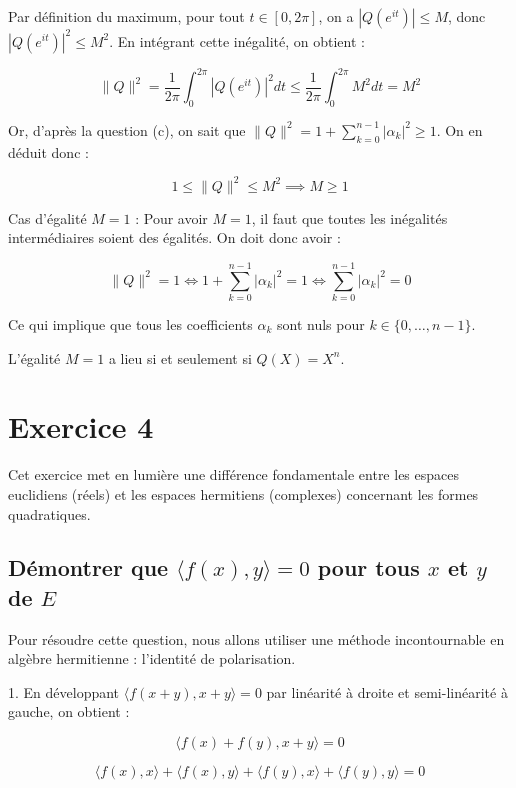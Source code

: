 \documentclass[french]{yLectureNote}
\begin{document}
Par définition du maximum, pour tout $t \in [0, 2\pi]$, on a $|Q(e^{it})| \le M$, donc $|Q(e^{it})|^2 \le M^2$.
En intégrant cette inégalité, on obtient :


$$\|Q\|^2 = \frac{1}{2\pi}\int_{0}^{2\pi} |Q(e^{it})|^2 dt \le \frac{1}{2\pi}\int_{0}^{2\pi} M^2 dt = M^2$$

Or, d'après la question (c), on sait que $\|Q\|^2 = 1 + \sum_{k=0}^{n-1} |\alpha_k|^2 \ge 1$.
On en déduit donc :


$$1 \le \|Q\|^2 \le M^2 \implies M \ge 1$$

Cas d'égalité $M = 1$ :
Pour avoir $M = 1$, il faut que toutes les inégalités intermédiaires soient des égalités. On doit donc avoir :


$$\|Q\|^2 = 1 \iff 1 + \sum_{k=0}^{n-1} |\alpha_k|^2 = 1 \iff \sum_{k=0}^{n-1} |\alpha_k|^2 = 0$$


Ce qui implique que tous les coefficients $\alpha_k$ sont nuls pour $k \in \{0, \dots, n-1\}$.

L'égalité $M = 1$ a lieu si et seulement si $Q(X) = X^n$.


\section{Exercice 4}

Cet exercice met en lumière une différence fondamentale entre les espaces euclidiens (réels) et les espaces hermitiens (complexes) concernant les formes quadratiques.

\subsection{Démontrer que $\langle f(x), y \rangle = 0$ pour tous $x$ et $y$ de $E$}

Pour résoudre cette question, nous allons utiliser une méthode incontournable en algèbre hermitienne : l'identité de polarisation.


1. En développant $\langle f(x+y), x+y \rangle = 0$ par linéarité à droite et semi-linéarité à gauche, on obtient :

$$\langle f(x) + f(y), x+y \rangle = 0$$


$$\langle f(x), x \rangle + \langle f(x), y \rangle + \langle f(y), x \rangle + \langle f(y), y \rangle = 0$$
\end{document}
